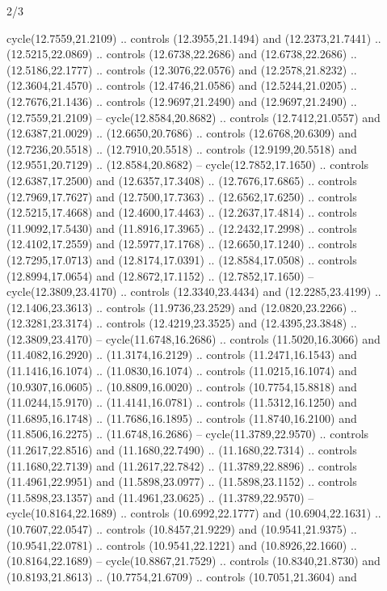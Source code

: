 \begin{flagdescription}{2/3}
\begin{scope}[yshift=\flagwidth,scale=\flagwidth/1241.93737]
\begin{scope}[y=-1mm, x=1mm,draw=gold,fill=blue,line join=miter,miter limit=4,line width=1.8\lw]
{  cycle(12.7559,21.2109) .. controls (12.3955,21.1494) and (12.2373,21.7441) ..
  (12.5215,22.0869) .. controls (12.6738,22.2686) and (12.6738,22.2686) ..
  (12.5186,22.1777) .. controls (12.3076,22.0576) and (12.2578,21.8232) ..
  (12.3604,21.4570) .. controls (12.4746,21.0586) and (12.5244,21.0205) ..
  (12.7676,21.1436) .. controls (12.9697,21.2490) and (12.9697,21.2490) ..
  (12.7559,21.2109) -- cycle(12.8584,20.8682) .. controls (12.7412,21.0557) and
  (12.6387,21.0029) .. (12.6650,20.7686) .. controls (12.6768,20.6309) and
  (12.7236,20.5518) .. (12.7910,20.5518) .. controls (12.9199,20.5518) and
  (12.9551,20.7129) .. (12.8584,20.8682) -- cycle(12.7852,17.1650) .. controls
  (12.6387,17.2500) and (12.6357,17.3408) .. (12.7676,17.6865) .. controls
  (12.7969,17.7627) and (12.7500,17.7363) .. (12.6562,17.6250) .. controls
  (12.5215,17.4668) and (12.4600,17.4463) .. (12.2637,17.4814) .. controls
  (11.9092,17.5430) and (11.8916,17.3965) .. (12.2432,17.2998) .. controls
  (12.4102,17.2559) and (12.5977,17.1768) .. (12.6650,17.1240) .. controls
  (12.7295,17.0713) and (12.8174,17.0391) .. (12.8584,17.0508) .. controls
  (12.8994,17.0654) and (12.8672,17.1152) .. (12.7852,17.1650) --
  cycle(12.3809,23.4170) .. controls (12.3340,23.4434) and (12.2285,23.4199) ..
  (12.1406,23.3613) .. controls (11.9736,23.2529) and (12.0820,23.2266) ..
  (12.3281,23.3174) .. controls (12.4219,23.3525) and (12.4395,23.3848) ..
  (12.3809,23.4170) -- cycle(11.6748,16.2686) .. controls (11.5020,16.3066) and
  (11.4082,16.2920) .. (11.3174,16.2129) .. controls (11.2471,16.1543) and
  (11.1416,16.1074) .. (11.0830,16.1074) .. controls (11.0215,16.1074) and
  (10.9307,16.0605) .. (10.8809,16.0020) .. controls (10.7754,15.8818) and
  (11.0244,15.9170) .. (11.4141,16.0781) .. controls (11.5312,16.1250) and
  (11.6895,16.1748) .. (11.7686,16.1895) .. controls (11.8740,16.2100) and
  (11.8506,16.2275) .. (11.6748,16.2686) -- cycle(11.3789,22.9570) .. controls
  (11.2617,22.8516) and (11.1680,22.7490) .. (11.1680,22.7314) .. controls
  (11.1680,22.7139) and (11.2617,22.7842) .. (11.3789,22.8896) .. controls
  (11.4961,22.9951) and (11.5898,23.0977) .. (11.5898,23.1152) .. controls
  (11.5898,23.1357) and (11.4961,23.0625) .. (11.3789,22.9570) --
  cycle(10.8164,22.1689) .. controls (10.6992,22.1777) and (10.6904,22.1631) ..
  (10.7607,22.0547) .. controls (10.8457,21.9229) and (10.9541,21.9375) ..
  (10.9541,22.0781) .. controls (10.9541,22.1221) and (10.8926,22.1660) ..
  (10.8164,22.1689) -- cycle(10.8867,21.7529) .. controls (10.8340,21.8730) and
  (10.8193,21.8613) .. (10.7754,21.6709) .. controls (10.7051,21.3604) and
}
\end{scope}
\end{scope}
\end{flagdescription}
